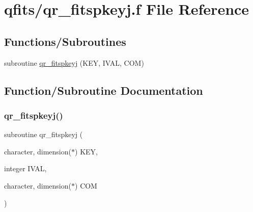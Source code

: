 \hypertarget{qr__fitspkeyj_8f}{}\section{qfits/qr\+\_\+fitspkeyj.f File Reference}
\label{qr__fitspkeyj_8f}
\subsection*{Functions/\+Subroutines}
\begin{DoxyCompactItemize}
\item 
subroutine \hyperlink{qr__fitspkeyj_8f_a24110af703b9d1aa63c48771015659ab}{qr\+\_\+fitspkeyj} (K\+EY, I\+V\+AL, C\+OM)
\end{DoxyCompactItemize}


\subsection{Function/\+Subroutine Documentation}
\mbox{\label{qr__fitspkeyj_8f_a24110af703b9d1aa63c48771015659ab}} 
\subsubsection{\texorpdfstring{qr\+\_\+fitspkeyj()}{qr\_fitspkeyj()}}
{\footnotesize\ttfamily subroutine qr\+\_\+fitspkeyj (\begin{DoxyParamCaption}\item[{character, dimension($\ast$)}]{K\+EY,  }\item[{integer}]{I\+V\+AL,  }\item[{character, dimension($\ast$)}]{C\+OM }\end{DoxyParamCaption})}

